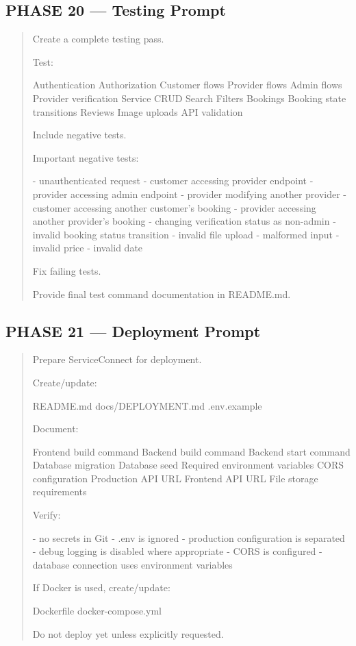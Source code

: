 \subsection*{PHASE 20 --- Testing Prompt}

\begin{quote}
Create a complete testing pass.

Test:

Authentication
Authorization
Customer flows
Provider flows
Admin flows
Provider verification
Service CRUD
Search
Filters
Bookings
Booking state transitions
Reviews
Image uploads
API validation

Include negative tests.

Important negative tests:

- unauthenticated request
- customer accessing provider endpoint
- provider accessing admin endpoint
- provider modifying another provider
- customer accessing another customer's booking
- provider accessing another provider's booking
- changing verification status as non-admin
- invalid booking status transition
- invalid file upload
- malformed input
- invalid price
- invalid date

Fix failing tests.

Provide final test command documentation in README.md.
\end{quote}

\subsection*{PHASE 21 --- Deployment Prompt}

\begin{quote}
Prepare ServiceConnect for deployment.

Create/update:

README.md
docs/DEPLOYMENT.md
.env.example

Document:

Frontend build command
Backend build command
Backend start command
Database migration
Database seed
Required environment variables
CORS configuration
Production API URL
Frontend API URL
File storage requirements

Verify:

- no secrets in Git
- .env is ignored
- production configuration is separated
- debug logging is disabled where appropriate
- CORS is configured
- database connection uses environment variables

If Docker is used, create/update:

Dockerfile
docker-compose.yml

Do not deploy yet unless explicitly requested.
\end{quote}

